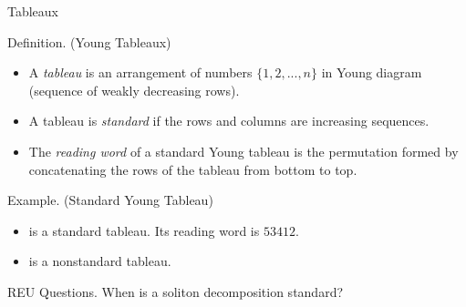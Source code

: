 \documentclass[aspectratio=169, serif]{beamer}
\begin{document}
\begin{frame}{Tableaux}
    \begin{block}{Definition. (Young Tableaux)}
        \begin{itemize}
        \small
            \item A \emph{tableau} 
            is an arrangement of numbers $\{1,2,...,n\}$ in Young diagram (sequence of weakly decreasing rows). \vspace{-0.25em}
            \item A tableau is \textit{standard} if the rows and columns are increasing 
 sequences. \vspace{-0.25em}
            \item The \textit{reading word} of a standard Young tableau is the permutation formed by concatenating the rows of the tableau from bottom to top.
        \end{itemize}
    \end{block}
    \begin{exampleblock}{Example. (Standard Young Tableau)}
        \begin{itemize}
        \item {} is a standard  tableau. Its reading word is $53412.$ %
        \item {} is a nonstandard tableau.
        \end{itemize}
        \vspace{-3.8pt}
    \end{exampleblock}

        \begin{block}{REU Questions.}
    When is a soliton decomposition standard? 
    \end{block}    
    
\end{frame}
\end{document}
